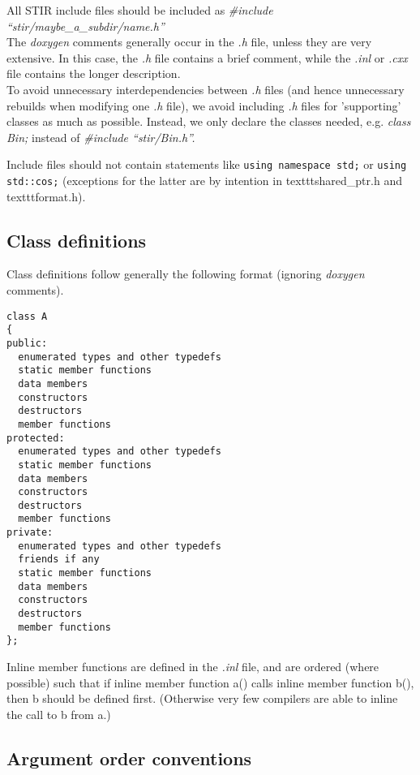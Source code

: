 \documentclass{article}
\begin{document}
All STIR include files should be included as \textit{\#include ``stir/maybe\_a\_subdir/name.h''}\\
The \textit{doxygen} comments generally occur in the \textit{.h} file, unless 
they are very extensive. In this case, the \textit{.h} file contains 
a brief comment, while the \textit{.inl} or \textit{.cxx} file contains 
the longer description.\\
To avoid unnecessary interdependencies between \textit{.h} files (and 
hence unnecessary rebuilds when modifying one \textit{.h} file), we 
avoid including \textit{.h} files for 'supporting' classes as much 
as possible. Instead, we only declare the classes needed, e.g. \textit{class 
Bin;} instead of \textit{\#include ``stir/Bin.h''.}

Include files should not contain statements like \texttt{using namespace std;} or
\texttt{using std::cos;} (exceptions for the latter are by intention in texttt{shared\_ptr.h}
and texttt{format.h}).

\subsection{
Class definitions}

Class definitions follow generally the following format (ignoring \textit{doxygen} 
comments).

\begin{verbatim}
class A
{
public: 
  enumerated types and other typedefs 
  static member functions  
  data members  
  constructors 
  destructors 
  member functions
protected: 
  enumerated types and other typedefs 
  static member functions 
  data members 
  constructors 
  destructors 
  member functions
private: 
  enumerated types and other typedefs 
  friends if any 
  static member functions 
  data members 
  constructors 
  destructors 
  member functions
};
\end{verbatim}


Inline member functions are defined in the \textit{.inl} file, and 
are ordered (where possible) such that if inline member function 
a() calls inline member function b(), 
then b should be defined first. (Otherwise very 
few compilers are able to inline the call to b 
from a.)



\subsection{
Argument order conventions}
\end{document}
